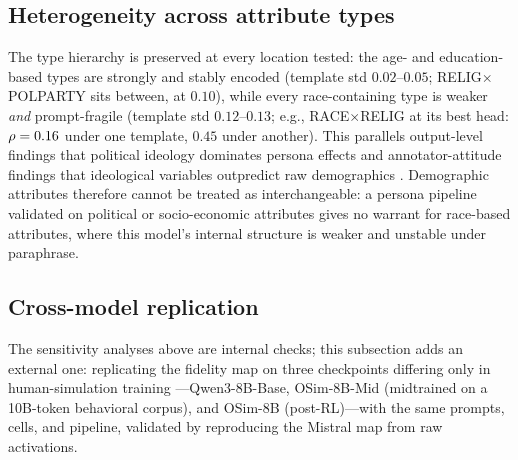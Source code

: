 \subsection{Heterogeneity across attribute types}
The type hierarchy is preserved at every location tested:
the age- and education-based types are strongly and stably encoded
(template std $0.02$--$0.05$; RELIG$\times$POLPARTY sits between, at
$0.10$), while every race-containing type is weaker \emph{and}
prompt-fragile (template std $0.12$--$0.13$; e.g.,
RACE$\times$RELIG at its best head: $\rho=0.16$ under one template,
$0.45$ under another). This parallels output-level findings that
political ideology dominates persona effects \citep{socratic2025} and
annotator-attitude findings that ideological variables outpredict raw
demographics \citep{annotators2022}. Demographic attributes therefore
cannot be treated as interchangeable: a persona pipeline validated on
political or socio-economic attributes gives no warrant for race-based
attributes, where this model's internal structure is weaker and unstable
under paraphrase.

\subsection{Cross-model replication}
\label{sec:crossmodel}
The sensitivity analyses above are internal checks; this subsection adds
an external one: replicating the fidelity map on three checkpoints
differing only in human-simulation training \citep{odyssim2026}---Qwen3-8B-Base,
OSim-8B-Mid (midtrained on a 10B-token behavioral corpus), and OSim-8B
(post-RL)---with the same prompts, cells, and pipeline, validated by
reproducing the Mistral map from raw activations.
\label{sec:robustness}

